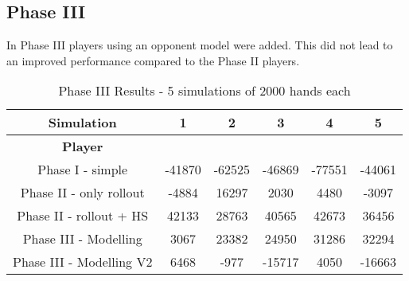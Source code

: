 \subsection{Phase III}
In Phase III players using an opponent model were added. This did not lead to an improved performance compared to the
Phase II players.

\begin{table}[!h]
\center
\caption{Phase III Results - 5 simulations of 2000 hands each}
\begin{tabular}{ c | c c c c c}
    \textbf{Simulation} & 1 & 2 & 3 & 4 & 5 \\
    \hline
    \textbf{Player} \\
    Phase I - simple            & -41870 & -62525   & -46869 & -77551 & -44061\\
    Phase II - only rollout     & -4884 & 16297     & 2030   & 4480  & -3097\\
    Phase II - rollout + HS     & 42133 & 28763     & 40565  & 42673 & 36456\\
    Phase III - Modelling       & 3067  & 23382     & 24950  & 31286 & 32294\\
    Phase III - Modelling V2    & 6468  & -977      & -15717 & 4050  & -16663\\
\end{tabular}
\end{table}

\pagebreak
